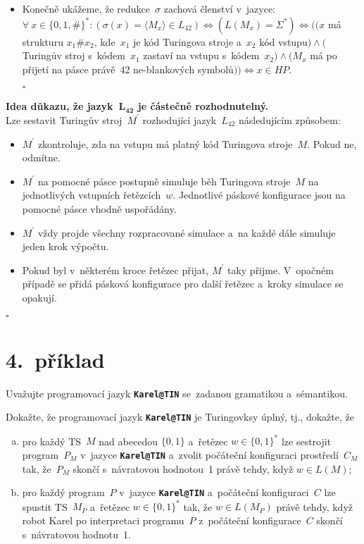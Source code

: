 \documentclass[a4paper, 11pt]{scrartcl}
\newcommand*{\QEDB}{\hfill\ensuremath{\square}}
\begin{document}
\begin{itemize}
		\item
			Konečně ukážeme, že redukce~$ \sigma $ zachová členství
			v~jazyce: \\
			$ \forall\ x \in \{0, 1, \#\}^* : (\sigma(x) = \langle
			M_x \rangle \in L_{42}) \Leftrightarrow (L(M_x) =
			\Sigma^*) \Leftrightarrow ((x $ má strukturu $ x_1\#x_2 $,
			kde~$ x_1 $ je kód Turingova stroje a~$ x_2 $ kód vstupu$
			) \wedge ( $Turingův stroj s~kódem~$ x_1 $ zastaví na
			vstupu s~kódem~$ x_2) \wedge (M_x $ má po přijetí na
			pásce právě~42 ne-blankových symbolů$ )) \Leftrightarrow
			x \in HP $.
		
		\QEDB
	\end{itemize}

	\textbf{%
		Idea důkazu, že jazyk~$ \boldsymbol{L_{42}} $ je  částečně
		rozhodnutelný.
	} \\
	Lze sestavit Turingův stroj~$ M^\prime $ rozhodující
	jazyk~$ L_{42} $ následujícím způsobem:
	\begin{itemize}
		\item
			$ M^\prime $ zkontroluje, zda na vstupu má platný kód
			Turingova stroje~$ M $. Pokud ne, odmítne.

		\item
			$ M^\prime $ na pomocné pásce postupně simuluje běh
			Turingova stroje~$ M $ na jednotlivých vstupních
			řetězcích~$ w $. Jednotlivé páskové konfigurace jsou
			na pomocné pásce vhodně uspořádány.

		\item
			$ M^\prime $ vždy projde všechny rozpracované simulace
			a~na každé dále simuluje jeden krok výpočtu.

		\item
			Pokud byl v~některém kroce řetězec přijat, $ M^\prime $
			taky přijme. V~opačném případě se přidá pásková konfigurace
			pro další řetězec a~kroky simulace se opakují.
	\end{itemize}
	\QEDB


	\section*{4.~příklad}

	Uvažujte programovací jazyk \textbf{\texttt{Karel@TIN}}
	se~zadanou gramatikou a~sémantikou.

	Dokažte, že programovací jazyk \textbf{\texttt{Karel@TIN}} je
	Turingovksy úplný, tj., dokažte, že
	\begin{enumerate}[(a)]
		\item
			pro každý TS~$ M $ nad abecedou $ \{0, 1\} $ a~řetězec
			$ w \in \{0, 1\}^* $ lze sestrojit program~$ P_M $
			v~jazyce \textbf{\texttt{Karel@TIN}} a~zvolit
			počáteční konfiguraci prostředí~$ C_M $ tak, že~$ P_M $
			skončí s~návratovou hodnotou~1 právě tehdy, když
			$ w \in L(M) $;

		\item
			pro každý program~$ P $ v~jazyce \textbf{\texttt{Karel@TIN}}
			a~počáteční konfiguraci~$ C $ lze spustit TS~$ M_P $
			a~řetězec $ w \in \{0, 1\}^* $ tak, že $ w \in L(M_P) $
			právě tehdy, když robot Karel po interpretaci programu~$ P $
			z~počáteční konfigurace~$ C $ skončí s~návratovou
			hodnotu~1.
	\end{enumerate}
\end{document}
